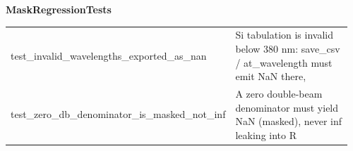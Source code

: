 \par\smallskip \textbf{MaskRegressionTests}\par\nopagebreak\smallskip
\begin{longtable}{@{}>{\ttfamily\scriptsize\raggedright\arraybackslash}p{0.40\linewidth} >{\footnotesize\raggedright\arraybackslash}p{0.555\linewidth}@{}}
test\_\allowbreak{}invalid\_\allowbreak{}wavelengths\_\allowbreak{}exported\_\allowbreak{}as\_\allowbreak{}nan & Si tabulation is invalid below 380 nm: save\_csv / at\_wavelength must emit NaN there, \\
test\_\allowbreak{}zero\_\allowbreak{}db\_\allowbreak{}denominator\_\allowbreak{}is\_\allowbreak{}masked\_\allowbreak{}not\_\allowbreak{}inf & A zero double-beam denominator must yield NaN (masked), never inf leaking into R \\
\end{longtable}
